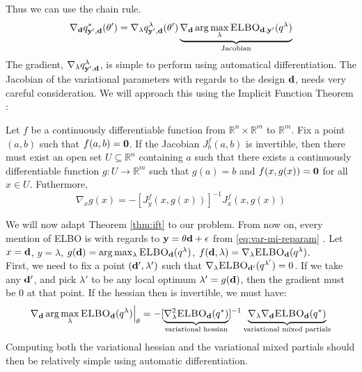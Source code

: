 Thus we can use the chain rule.
\begin{equation}
  \nabla_{\mathbf{d}} q^*_{\mathbf{y}', \mathbf{d}}(\theta') = \nabla_\lambda q^{\lambda}_{\mathbf{y}', \mathbf{d}}(\theta')\underbrace{\nabla_{\mathbf{d}} \arg \max_\lambda \textsc{ELBO}_{\mathbf{d}, \mathbf{y}'}(q^\lambda)}_{\textrm{Jacobian}}
\end{equation}
The gradient, $\nabla_\lambda q^\lambda_{\mathbf{y}',\mathbf{d}}$, is simple to perform using automatical differentiation.
The Jacobian of the variational parameters with regards to the design $\mathbf{d}$, needs very careful consideration. 
We will approach this using the Implicit Function Theorem \cite{lorraine19}:
\begin{theorem}
  Let $f$ be a continuously differentiable function from $\mathbb{R}^n \times \mathbb{R}^m$ to $\mathbb{R}^m$.
  Fix a point $(a, b)$ such that $f(a, b) = \mathbf{0}$. 
  If the Jacobian $J_b^{f}(a, b)$ is invertible, then there must exist an open set $U \subseteq \mathbb{R}^n$ containing $a$
  such that there exists a continuously differentiable function $g: U \rightarrow \mathbb{R}^m$ such that $g(a) = b$ and $f(x, g(x)) = \mathbf{0}$ for all $x \in U$.
  Futhermore,
  $$\nabla_{x}g(x) = -[J_y^f(x, g(x))]^{-1}J_{x}^{f}(x, g(x))$$
  \label{thm:ift}
\end{theorem}
We will now adapt Theorem \ref{thm:ift} to our problem. 
From now on, every mention of ELBO is with regards to $\mathbf{y} = \theta \mathbf{d} + \epsilon$ from \eqref{eq:var-mi-reparam} .
Let $x=\mathbf{d}$, $y=\lambda$, $g(\mathbf{d}) = \arg \max_{\lambda} \textsc{ELBO}_{\mathbf{d}}(q^{\lambda})$, $f(\mathbf{d}, \lambda) = \nabla_{\lambda}\textsc{ELBO}_{\mathbf{d}}(q^{\lambda})$.
\\
First, we need to fix a point $(\mathbf{d}', \lambda')$ such that $\nabla_{\lambda}\textsc{ELBO}_{\mathbf{d}'}(q^{\lambda'}) = 0$.
If we take any $\mathbf{d}'$, and pick $\lambda'$ to be any local optimum $\lambda' = g(\mathbf{d})$, then the gradient must be $0$ at that point.
If the hessian then is invertible, we must have:
\begin{equation}
  \nabla_{\mathbf{d}} \arg \max_{\lambda} \textsc{ELBO}_{\mathbf{d}}(q^{\lambda})\Bigr\rvert_{\theta}= 
  -[\underbrace{\nabla^2_{\lambda} \textsc{ELBO}_{\mathbf{d}}(q^*)}_{\textrm{variational hessian}}]^{-1}
  \underbrace{\nabla_{\lambda}\nabla_{\mathbf{d}}\textsc{ELBO}_{\mathbf{d}}(q^*)}_{\textrm{variational mixed partials}}
  \label{eq:variational-jacobian}
\end{equation}
Computing both the variational hessian and the variational mixed partials should then be relatively simple using automatic differentiation.
